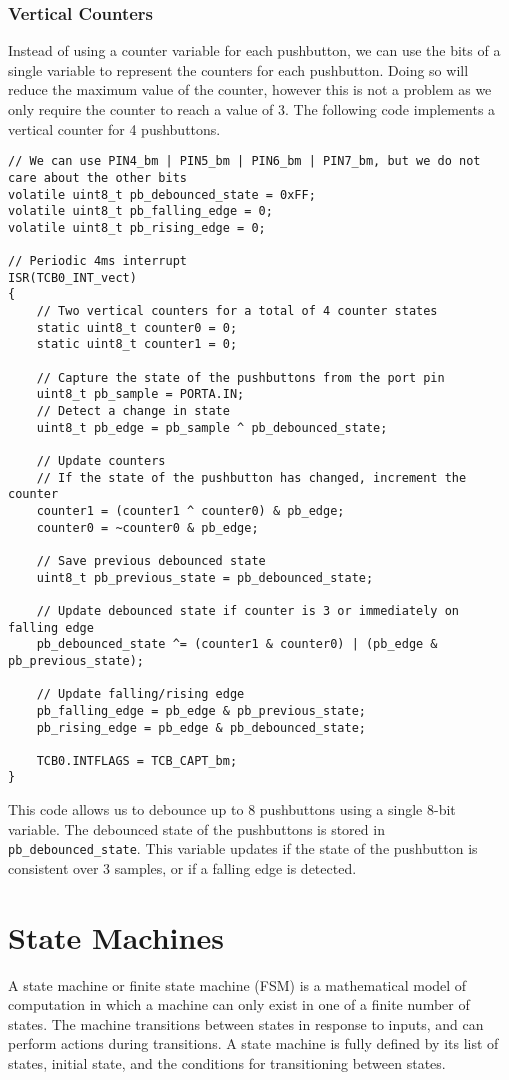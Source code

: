 \documentclass[a4paper]{report}
\begin{document}
\subsection{Vertical Counters}
Instead of using a counter variable for each pushbutton, we can use the
bits of a single variable to represent the counters for each
pushbutton. Doing so will reduce the maximum value of the counter,
however this is not a problem as we only require the counter to reach a
value of 3. The following code implements a vertical counter for 4
pushbuttons.
\begin{verbatim}
// We can use PIN4_bm | PIN5_bm | PIN6_bm | PIN7_bm, but we do not care about the other bits
volatile uint8_t pb_debounced_state = 0xFF;
volatile uint8_t pb_falling_edge = 0;
volatile uint8_t pb_rising_edge = 0;

// Periodic 4ms interrupt
ISR(TCB0_INT_vect)
{
    // Two vertical counters for a total of 4 counter states
    static uint8_t counter0 = 0;
    static uint8_t counter1 = 0;

    // Capture the state of the pushbuttons from the port pin
    uint8_t pb_sample = PORTA.IN;
    // Detect a change in state
    uint8_t pb_edge = pb_sample ^ pb_debounced_state;

    // Update counters
    // If the state of the pushbutton has changed, increment the counter
    counter1 = (counter1 ^ counter0) & pb_edge;
    counter0 = ~counter0 & pb_edge;

    // Save previous debounced state
    uint8_t pb_previous_state = pb_debounced_state;

    // Update debounced state if counter is 3 or immediately on falling edge
    pb_debounced_state ^= (counter1 & counter0) | (pb_edge & pb_previous_state);

    // Update falling/rising edge
    pb_falling_edge = pb_edge & pb_previous_state;
    pb_rising_edge = pb_edge & pb_debounced_state;

    TCB0.INTFLAGS = TCB_CAPT_bm;
}
\end{verbatim}
This code allows us to debounce up to 8 pushbuttons using a single
8-bit variable. The debounced state of the pushbuttons is stored in
\texttt{pb_debounced_state}. This variable updates if the state
of the pushbutton is consistent over 3 samples, or if a falling edge is
detected.
\chapter{State Machines}
A state machine or finite state machine (FSM) is a mathematical model
of computation in which a machine can only exist in one of a finite
number of states. The machine transitions between states in response to
inputs, and can perform actions during transitions. A state machine is
fully defined by its list of states, initial state, and the conditions
for transitioning between states.
\end{document}
